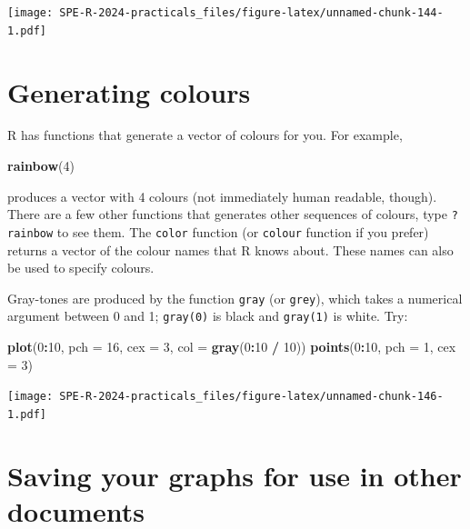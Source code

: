\documentclass[
]{book}
\newenvironment{Shaded}{\begin{snugshade}}{\end{snugshade}}
\newcommand{\AttributeTok}[1]{\textcolor[rgb]{0.13,0.29,0.53}{#1}}
\newcommand{\DecValTok}[1]{\textcolor[rgb]{0.00,0.00,0.81}{#1}}
\newcommand{\FunctionTok}[1]{\textcolor[rgb]{0.13,0.29,0.53}{\textbf{#1}}}
\newcommand{\NormalTok}[1]{#1}
\newcommand{\SpecialCharTok}[1]{\textcolor[rgb]{0.81,0.36,0.00}{\textbf{#1}}}
\begin{document}
\texttt{[image: SPE-R-2024-practicals\_files/figure-latex/unnamed-chunk-144-1.pdf]}

\section{Generating colours}\label{generating-colours}

R has functions that generate a vector of colours for you. For example,

\begin{Shaded}
\begin{Highlighting}[]
\FunctionTok{rainbow}\NormalTok{(}\DecValTok{4}\NormalTok{)}
\end{Highlighting}
\end{Shaded}

produces a vector with 4 colours (not immediately human readable,
though). There are a few other functions that generates other
sequences of colours, type \texttt{?rainbow} to see them. The
\texttt{color} function (or \texttt{colour} function if you prefer)
returns a vector of the colour names that R knows about. These
names can also be used to specify colours.

Gray-tones are produced by the function \texttt{gray} (or
\texttt{grey}), which takes a numerical argument between 0 and 1;
\texttt{gray(0)} is black and \texttt{gray(1)} is white. Try:

\begin{Shaded}
\begin{Highlighting}[]
\FunctionTok{plot}\NormalTok{(}\DecValTok{0}\SpecialCharTok{:}\DecValTok{10}\NormalTok{, }\AttributeTok{pch =} \DecValTok{16}\NormalTok{, }\AttributeTok{cex =} \DecValTok{3}\NormalTok{, }\AttributeTok{col =} \FunctionTok{gray}\NormalTok{(}\DecValTok{0}\SpecialCharTok{:}\DecValTok{10} \SpecialCharTok{/} \DecValTok{10}\NormalTok{))}
\FunctionTok{points}\NormalTok{(}\DecValTok{0}\SpecialCharTok{:}\DecValTok{10}\NormalTok{, }\AttributeTok{pch =} \DecValTok{1}\NormalTok{, }\AttributeTok{cex =} \DecValTok{3}\NormalTok{)}
\end{Highlighting}
\end{Shaded}

\texttt{[image: SPE-R-2024-practicals\_files/figure-latex/unnamed-chunk-146-1.pdf]}

\section{Saving your graphs for use in other documents}\label{saving-your-graphs-for-use-in-other-documents}
\end{document}
